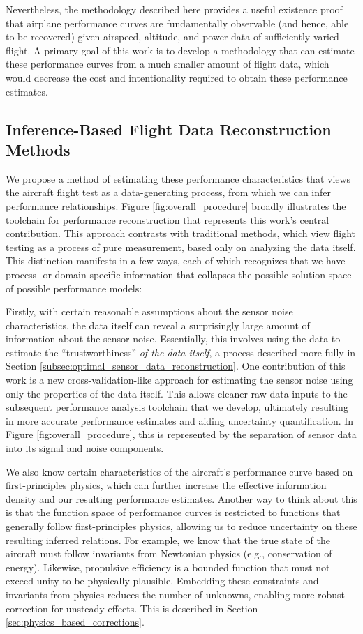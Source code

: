 Nevertheless, the methodology described here provides a useful existence proof that airplane performance curves are fundamentally observable (and hence, able to be recovered) given airspeed, altitude, and power data of sufficiently varied flight. A primary goal of this work is to develop a methodology that can estimate these performance curves from a much smaller amount of flight data, which would decrease the cost and intentionality required to obtain these performance estimates.

\subsection{Inference-Based Flight Data Reconstruction Methods}

We propose a method of estimating these performance characteristics that views the aircraft flight test as a data-generating process, from which we can infer performance relationships. Figure \ref{fig:overall_procedure} broadly illustrates the toolchain for performance reconstruction that represents this work's central contribution. This approach contrasts with traditional methods, which view flight testing as a process of pure measurement, based only on analyzing the data itself. This distinction manifests in a few ways, each of which recognizes that we have process- or domain-specific information that collapses the possible solution space of possible performance models:

Firstly, with certain reasonable assumptions about the sensor noise characteristics, the data itself can reveal a surprisingly large amount of information about the sensor noise. Essentially, this involves using the data to estimate the ``trustworthiness'' \emph{of the data itself}, a process described more fully in Section \ref{subsec:optimal_sensor_data_reconstruction}. One contribution of this work is a new cross-validation-like approach for estimating the sensor noise using only the properties of the data itself. This allows cleaner raw data inputs to the subsequent performance analysis toolchain that we develop, ultimately resulting in more accurate performance estimates and aiding uncertainty quantification. In Figure \ref{fig:overall_procedure}, this is represented by the separation of sensor data into its signal and noise components.

We also know certain characteristics of the aircraft's performance curve based on first-principles physics, which can further increase the effective information density and our resulting performance estimates. Another way to think about this is that the function space of performance curves is restricted to functions that generally follow first-principles physics, allowing us to reduce uncertainty on these resulting inferred relations. For example, we know that the true state of the aircraft must follow invariants from Newtonian physics (e.g., conservation of energy). Likewise, propulsive efficiency is a bounded function that must not exceed unity to be physically plausible. Embedding these constraints and invariants from physics reduces the number of unknowns, enabling more robust correction for unsteady effects. This is described in Section \ref{sec:physics_based_corrections}.

